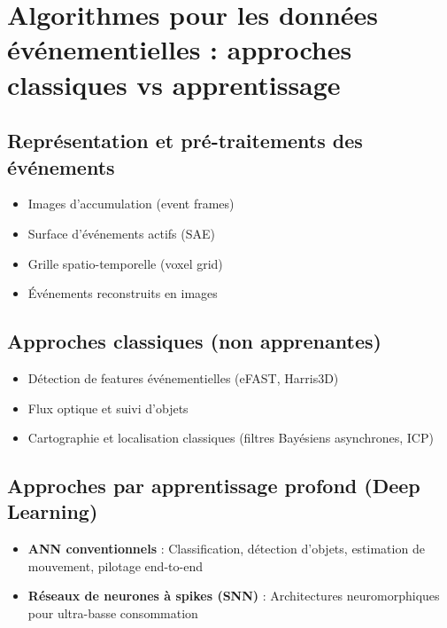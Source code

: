 \section{Algorithmes pour les données événementielles : approches classiques vs apprentissage}
\subsection{Représentation et pré-traitements des événements}
\begin{itemize}
\item Images d'accumulation (event frames) \cite{bugueno2025human}
\item Surface d'événements actifs (SAE)
\item Grille spatio-temporelle (voxel grid)
\item Événements reconstruits en images \cite{scheerlinck2020fast}
\end{itemize}

\subsection{Approches classiques (non apprenantes)}
\begin{itemize}
\item Détection de features événementielles (eFAST, Harris3D)
\item Flux optique et suivi d'objets \cite{zhu2023dynamic}
\item Cartographie et localisation classiques (filtres Bayésiens asynchrones, ICP)
\end{itemize}

\subsection{Approches par apprentissage profond (Deep Learning)}
\begin{itemize}
\item \textbf{ANN conventionnels} : Classification, détection d'objets, estimation de mouvement, pilotage end-to-end \cite{delbruck2018endtoend}
\item \textbf{Réseaux de neurones à spikes (SNN)} : Architectures neuromorphiques pour ultra-basse consommation \cite{kaiser2016towards}
\end{itemize}

